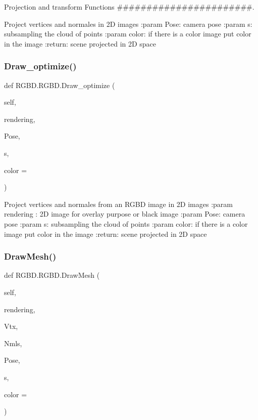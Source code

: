 Projection and transform Functions \#\#\#\#\#\#\#\#\#\#\#\#\#\#\#\#\#\#\#\#\#\#\#. 

\begin{DoxyVerb}Project vertices and normales in 2D images
:param Pose: camera pose
:param s: subsampling the cloud of points
:param color: if there is a color image put color in the image
:return: scene projected in 2D space
\end{DoxyVerb}
 \mbox{\label{class_r_g_b_d_1_1_r_g_b_d_a6fa82c4fbe506f20bf54911c385be73f}} 
\subsubsection{Draw\+\_\+optimize()}
{\footnotesize\ttfamily def R\+G\+B\+D.\+R\+G\+B\+D.\+Draw\+\_\+optimize (\begin{DoxyParamCaption}\item[{}]{self,  }\item[{}]{rendering,  }\item[{}]{Pose,  }\item[{}]{s,  }\item[{}]{color = {} }\end{DoxyParamCaption})}

\begin{DoxyVerb}Project vertices and normales from an RGBD image in 2D images
:param rendering : 2D image for overlay purpose or black image
:param Pose: camera pose
:param s: subsampling the cloud of points
:param color: if there is a color image put color in the image
:return: scene projected in 2D space
\end{DoxyVerb}
 \mbox{\label{class_r_g_b_d_1_1_r_g_b_d_a64b91c854c9de20090ad961f201fe026}} 
\subsubsection{Draw\+Mesh()}
{\footnotesize\ttfamily def R\+G\+B\+D.\+R\+G\+B\+D.\+Draw\+Mesh (\begin{DoxyParamCaption}\item[{}]{self,  }\item[{}]{rendering,  }\item[{}]{Vtx,  }\item[{}]{Nmls,  }\item[{}]{Pose,  }\item[{}]{s,  }\item[{}]{color = {} }\end{DoxyParamCaption})}

